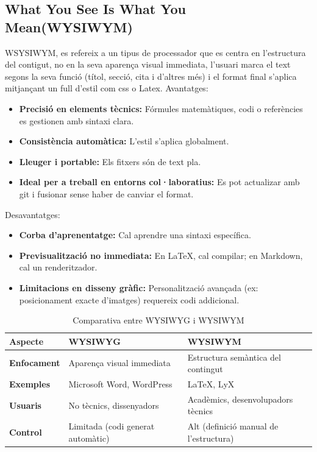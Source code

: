 \subsection{What You See Is What You Mean(WYSIWYM)}\label{subsec:4.2.2}
WSYSIWYM, es refereix a un tipus de processador que es centra en l'estructura del contigut, no en la seva aparença visual immediata, l'usuari marca el text segons la seva funció (títol, secció, cita i d'altres més) i el format final s'aplica mitjançant un full d'estil com css o Latex.
Avantatges:
\begin{itemize}
\item \textbf{Precisió en elements tècnics:} Fórmules matemàtiques, codi o referències es gestionen amb sintaxi clara.
\item \textbf{Consistència automàtica:} L'estil s'aplica globalment.
\item \textbf{Lleuger i portable:} Els fitxers són de text pla.
 \item \textbf{Ideal per a treball en entorns col·laboratius:} Es pot actualizar amb git i fusionar sense haber de canviar el format.
\end{itemize}
Desavantatges:
\begin{itemize}
\item \textbf{Corba d'aprenentatge:} Cal aprendre una sintaxi específica.
 \item \textbf{Previsualització no immediata:} En LaTeX, cal compilar; en Markdown, cal un renderitzador.
 \item \textbf{Limitacions en disseny gràfic:} Personalització avançada (ex: posicionament exacte d'imatges) requereix codi addicional.
\end{itemize}

\begin{table}[h!]
\begin{tabular}{|l|l|l|}
\hline
\textbf{Aspecte} & \textbf{WYSIWYG} & \textbf{WYSIWYM} \\ \hline
\textbf{Enfocament} & Aparença visual immediata & Estructura semàntica del contingut \\ \hline
\textbf{Exemples} & Microsoft Word, WordPress & LaTeX, LyX \\ \hline
\textbf{Usuaris} & No tècnics, dissenyadors &  Acadèmics, desenvolupadors tècnics \\ \hline
\textbf{Control} &  Limitada (codi generat automàtic) & Alt (definició manual de l'estructura) \\ \hline
\end{tabular}
\caption{Comparativa entre WYSIWYG i WYSIWYM}
\end{table}



